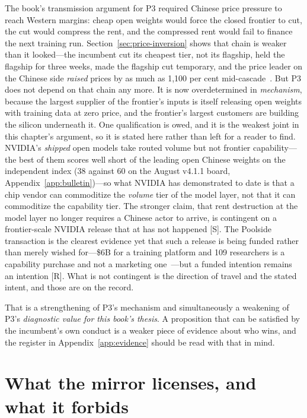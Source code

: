 The book's transmission argument for P3 required Chinese price pressure to reach Western margins: cheap open weights would force the closed frontier to cut, the cut would compress the rent, and the compressed rent would fail to finance the next training run. Section~\ref{sec:price-inversion} shows that chain is weaker than it looked---the incumbent cut its cheapest tier, not its flagship, held the flagship for three weeks, made the flagship cut temporary, and the price leader on the Chinese side \emph{raised} prices by as much as 1{,}100 per cent mid-cascade~\cite{deepseek-raise}. But P3 does not depend on that chain any more. It is now overdetermined in \emph{mechanism}, because the largest supplier of the frontier's inputs is itself releasing open weights with training data at zero price, and the frontier's largest customers are building the silicon underneath it. One qualification is owed, and it is the weakest joint in this chapter's argument, so it is stated here rather than left for a reader to find. NVIDIA's \emph{shipped} open models take routed volume but not frontier capability---the best of them scores well short of the leading open Chinese weights on the independent index (38 against 60 on the August v4.1.1 board, Appendix~\ref{app:bulletin})---so what NVIDIA has demonstrated to date is that a chip vendor can commoditize the \emph{volume} tier of the model layer, not that it can commoditize the capability tier. The stronger claim, that rent destruction at the model layer no longer requires a Chinese actor to arrive, is contingent on a frontier-scale NVIDIA release that at \datafreeze has not happened [S]. The Poolside transaction is the clearest evidence yet that such a release is being funded rather than merely wished for---\$6B for a training platform and 109 researchers is a capability purchase and not a marketing one~\cite{nvda-poolside}---but a funded intention remains an intention [R]. What is not contingent is the direction of travel and the stated intent, and those are on the record.

That is a strengthening of P3's mechanism and simultaneously a weakening of P3's \emph{diagnostic value for this book's thesis}. A proposition that can be satisfied by the incumbent's own conduct is a weaker piece of evidence about who wins, and the register in Appendix~\ref{app:evidence} should be read with that in mind.

\section{What the mirror licenses, and what it forbids}
\label{sec:mirror-license}


